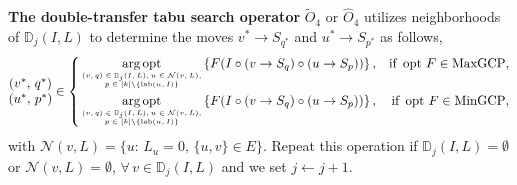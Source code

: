 \documentclass[12pt, a4paper]{article}%
\DeclareMathOperator*{\argopt}{\ensuremath{arg\,opt}}
\DeclareMathOperator*{\opt}{\ensuremath{opt}}
\newcommand{\labeling}{\ensuremath{\mathrm{lab}}}
\numberwithin{equation}{section}
\theoremstyle{plain}
\begin{document}
			\textbf{The double-transfer tabu search operator} $\widetilde{O}_4$ or $\widehat{O}_4$  utilizes neighborhoods of $\mathbb{D}_j(I,L)$ to determine the moves ${v}^*\rightarrow S_{{q}^*}$ and ${u}^*\rightarrow S_{{p}^*}$ as follows,
			\begin{equation}
				\label{choice::o4cut}
				\begin{matrix}
					({v}^*,\,{q}^*)\\
					({u}^*,\,{p}^*)
				\end{matrix}
				\in 
				\left\{
				\begin{aligned}
					&\argopt_{\begin{tiny}
							\begin{matrix}
								(v,q)\in\mathbb{D}_j(I,L),u\in\mathcal{N}(v,L),\\
								p\in[k]\backslash\{\labeling(u,I)\}
							\end{matrix}
					\end{tiny}}\left\{F(I\circ (v\rightarrow S_q)\circ (u\rightarrow S_p))\right\}, &
					\text{if }\opt\, F\in\text{MaxGCP},\\
					&\argopt_{\begin{tiny}
							\begin{matrix}
								(v,q)\in\mathbb{D}_j(I,L),u\in\mathcal{N}(v,L),\\
								p\in[k]\backslash\{\labeling(u,I)\}
							\end{matrix}
					\end{tiny}}\left\{F(I\circ (v\rightarrow S_q)\circ (u\rightarrow S_p))\right\}, &
					\text{if }\opt\, F\in\text{MinGCP},
				\end{aligned}
				\right.
			\end{equation}
			with $\mathcal{N}(v,L)=\{u:\,L_u=0,\,\{u,v\}\in E\}$. Repeat this operation if $\mathbb{D}_j(I,L)=\emptyset$ or $\mathcal{N}(v,L)=\emptyset$, $\forall\,v\in\mathbb{D}_j(I,L)$ and we set $j\leftarrow j+1$.  %
			
			
			
			
			
			
\end{document}
